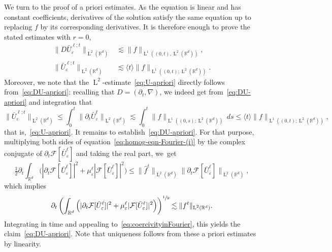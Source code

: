 \documentclass[JEP,XML,SOM,Unicode,published]{cedram}
\theoremstyle{plain}
\theoremstyle{definition}
\numberwithin{equation}{section}
\newcommand{\e}{\varepsilon}
\newcommand{\R}{\mathbb R}
\newcommand{\F}{\mathcal F}
\newcommand{\Ld}{\operatorname{L}}
\begin{document}
We turn to the proof of a priori estimates. As the equation is linear and has constant coefficients, derivatives of the solution satisfy the same equation up to replacing $f$ by its corresponding derivatives. It is therefore enough
to prove the stated estimates with $r=0$,
\begin{align}
\|D\bar U_\e^{\ell;t}\|_{\Ld^2(\R^d)}&\lesssim\|f\|_{\Ld^1((0,t),\Ld^2(\R^d))},\label{eq:DU-apriori}\\
\|\bar U_\e^{\ell;t}\|_{\Ld^2(\R^d)}&\lesssim\langle t\rangle\|f\|_{\Ld^1((0,t);\Ld^2(\R^d))}.\label{eq:U-apriori}
\end{align}
Moreover, we note that the $\Ld^2$-estimate~\eqref{eq:U-apriori} directly follows from~\eqref{eq:DU-apriori}: recalling that $D=(\partial_t,\nabla)$, we indeed get from~\eqref{eq:DU-apriori} and integration that
\begin{equation*}
\|\bar U_{\e}^{\ell;t}\|_{\Ld^2(\R^d)}\le \int_{0}^t\|\partial_t \bar U_{\e}^{\ell}\|_{\Ld^2(\R^d)}\lesssim \int_{0}^t\|f\|_{\Ld^1((0,s);\Ld^2(\R^d))}\,ds\le \langle t\rangle \|f\|_{\Ld^1((0,t);\Ld^2(\R^d))},
\end{equation*}
that is,~\eqref{eq:U-apriori}.
It remains to establish~\eqref{eq:DU-apriori}. For that purpose, multiplying both sides of equation~\eqref{eq:homog-eqn-Fourier-(i)} by {the complex conjugate of} $\partial_t\F[\bar U_\e^\ell]$ {and taking the real part}, we~get
\begin{equation*}
\tfrac{1}{2}\partial_t\int_{\R^d}\Big(|\partial_t\F[\bar U_\e^\ell]|^2+\mu^{\ell}_{\e}|\F[\bar U_\e^\ell]|^2\Big)\le \|\hat f^t\|_{\Ld^2(\R^d)}\|\partial_t\F[\bar U_\e^\ell]\|_{\Ld^2(\R^d)},
\end{equation*}
which implies
\begin{equation*}
\partial_t\left(\int_{\R^d}\Big(|\partial_t\F[\bar U_\e^\ell]|^2+\mu^{\ell}_{\e}|\F[\bar U_\e^\ell]|^2\Big)\right)^{\sfrac{1}{2}}\lesssim \|f^t\|_{\Ld^2(\R^d)}.
\end{equation*}
Integrating in time and appealing to~\eqref{eq:coercivityinFourier}, this yields the claim~\eqref{eq:DU-apriori}.
Note that uniqueness follows from these a priori estimates by linearity.
\end{document}
